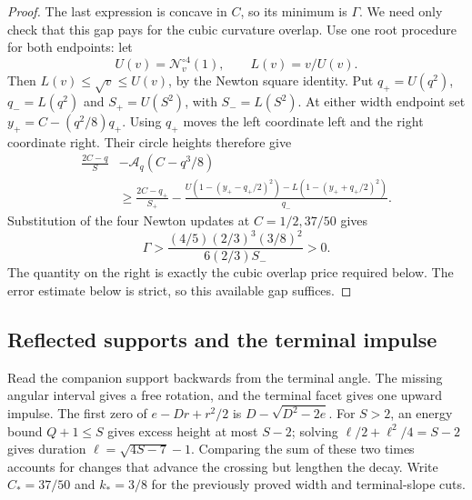 \begin{proof}
The last expression is concave in $C$, so its minimum is $\Gamma$.
We need only check that this gap pays for the cubic curvature overlap.
Use one root procedure for both endpoints: let
\[
 U(v)=\mathcal N_v^{\circ4}(1),\qquad L(v)=v/U(v).
\]
Then $L(v)\le\sqrt v\le U(v)$, by the Newton square identity.
Put $q_+=U(q^2)$, $q_-=L(q^2)$ and $S_+=U(S^2)$, with $S_-=L(S^2)$.
At either width endpoint set $y_+=C-(q^2/8)q_+$.
Using $q_+$ moves the left coordinate left and the right coordinate right.
Their circle heights therefore give
\[
 \begin{aligned}
 \frac{2C-q}{S}&-\mathcal A_q(C-q^3/8)\\
 &\ge\frac{2C-q_+}{S_+}
 -\frac{U(1-(y_+-q_+/2)^2)-L(1-(y_++q_+/2)^2)}{q_-}.
 \end{aligned}
\]
Substitution of the four Newton updates at $C=1/2,37/50$ gives
\begin{equation}\label{eq:terminal-gap-payment}
 \Gamma>
 \frac{(4/5)(2/3)^3(3/8)^2}{6(2/3)S_-}>0.
\end{equation}
The quantity on the right is exactly the cubic overlap price required
below. The error estimate below is strict, so this available gap suffices.
\end{proof}

\subsection{Reflected supports and the terminal impulse}

Read the companion support backwards from the terminal angle. The missing
angular interval gives a free rotation, and the terminal facet gives one
upward impulse. The first zero of $e-Dr+r^2/2$ is
$D-\sqrt{D^2-2e}$. For $S>2$, an energy bound $Q+1\le S$ gives
excess height at most $S-2$; solving $\ell/2+\ell^2/4=S-2$ gives
duration $\ell=\sqrt{4S-7}-1$. Comparing the sum of these two times
accounts for changes that advance the crossing but lengthen the decay.
Write $C_*=37/50$ and $ k_*=3/8$ for the previously proved width
and terminal-slope cuts.

